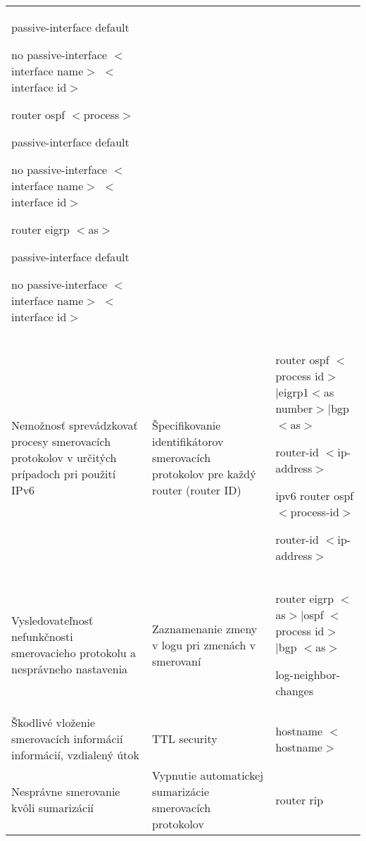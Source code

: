 \begin{longtable}[!htbp]{|L{10em}L{10em}>{\selectfont}L{34em}|}
	\hspace{0.5em}passive-interface default
	
	\hspace{0.5em}no passive-interface $<$interface name$>$ $<$interface id$>$
	
	router ospf $<$process$>$
	
	\hspace{0.5em}passive-interface default
	
	\hspace{0.5em}no passive-interface $<$interface name$>$ $<$interface id$>$
	
	router eigrp $<$as$>$
	
	\hspace{0.5em}passive-interface default
	
	\hspace{0.5em}no passive-interface $<$interface name$>$ $<$interface id$>$\\
	
	
	
	
	Nemožnosť sprevádzkovať procesy smerovacích protokolov v určitých prípadoch pri použití IPv6	&Špecifikovanie identifikátorov smerovacích protokolov pre každý router (router ID)	&router ospf $<$process id$>$|eigrp1$<$as number$>$|bgp$<$as$>$
	
	\hspace{0.5em}router-id $<$ip-address$>$ 
	
	ipv6 router ospf  $<$process-id$>$
	
	\hspace{0.5em} router-id $<$ip-address$>$ \\
	
	
	
	
	 Vysledovateľnosť nefunkčnosti smerovacieho protokolu a nesprávneho nastavenia	&Zaznamenanie zmeny v logu pri zmenách v smerovaní	&router eigrp $<$as$>$|ospf $<$process id$>$|bgp $<$as$>$
	
	\hspace{0.5em}log-neighbor-changes\\
	
	
	
	Škodlivé vloženie smerovacích informácií informácií, vzdialený útok	&TTL security	&hostname $<$hostname$>$\\
	
	
	
	 Nesprávne smerovanie kvôli sumarizácií	&Vypnutie automatickej sumarizácie smerovacích protokolov	&router rip
	

\end{longtable}
